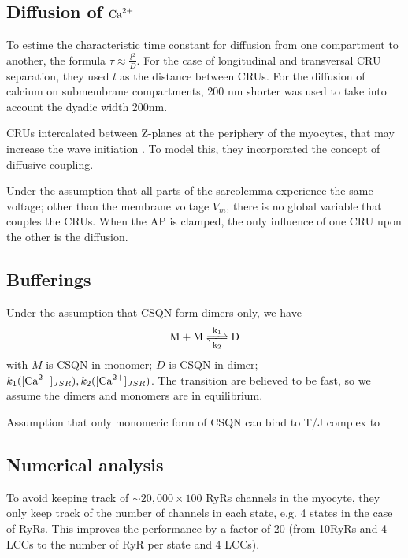 \subsection{Diffusion of ${\text{Ca}^{2+}}$}

To estime the characteristic time constant for diffusion from one compartment to
another, the formula $\tau \approx \frac{l^2}{D}$. For the case of longitudinal
and transversal CRU separation, they used $l$ as the distance between CRUs. For
the diffusion of calcium on submembrane compartments, 200 nm shorter was used to
take into account the dyadic width 200nm.

CRUs intercalated between Z-planes at the periphery of the myocytes, that may
increase the wave initiation \citep{chen-izu2006tdd, izu2006irr}. To model this,
they incorporated the concept of diffusive coupling.


\begin{framed}
  Under the assumption that all parts of the sarcolemma experience the
  same voltage; other than the membrane voltage $V_m$, there is no
  global variable that couples the CRUs. When the AP is clamped, the
  only influence of one CRU upon the other is the 
  diffusion.
\end{framed}

\subsection{Bufferings}

Under the assumption that CSQN form dimers only, we have
\begin{equation}
  \label{eq:875}
  \ce{M + M <=>[k_1][k_2] D}
\end{equation}
with $M$ is CSQN in monomer; $D$ is CSQN in dimer;
$k_1([\ce{Ca^2+}]_{JSR}), k_2([\ce{Ca^2+}]_{JSR})$. The transition are
believed to be fast, so we assume the dimers and monomers are in
equilibrium. 

Assumption that only monomeric form of CSQN can bind to T/J complex to 

\subsection{Numerical analysis}

To avoid keeping track of $\sim 20,000 \times 100$ RyRs channels in the myocyte,
they only keep track of the number of channels in each state, e.g. 4 states in
the case of RyRs. This improves the performance by a factor of 20 (from 10RyRs
and 4 LCCs to the number of RyR per state and 4 LCCs). 

